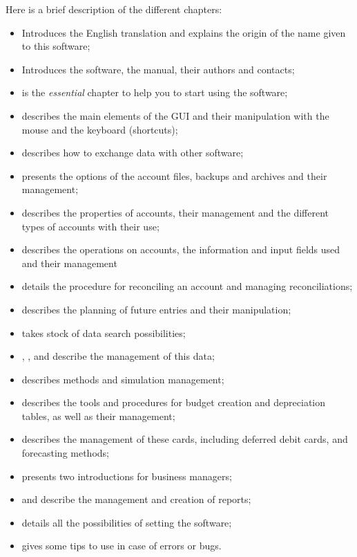 

Here is a brief description of the different chapters:

\begin{itemize}%
	\item {} Introduces the English translation and explains the origin of the name given to this software;
	\item {} Introduces the software, the manual, their authors and contacts;
	\item {} is the \emph{essential} chapter to help you to start using the software;
	\item {} describes the main elements of the GUI and their manipulation with the mouse and the keyboard (shortcuts);
	\item {} describes how to exchange data with other software;
	\item {} presents the options of the account files, backups and archives and their management;
	\item {} describes the properties of accounts, their management and the different types of accounts with their use;
	\item {} describes the operations on accounts, the information and input fields used and their management
	\item {} details the procedure for reconciling an account and managing reconciliations;
	\item {} describes the planning of future entries and their manipulation;
	\item {} takes stock of data search possibilities;
	\item {}, ,  and  describe the management of this data;
	\item {} describes methods and simulation management;
	\item {} describes the tools and procedures for budget creation and depreciation tables, as well as their management;
	\item {} describes the management of these cards, including deferred debit cards, and forecasting methods;
	\item {} presents two introductions for business managers;
	\item {} and  describe the management and creation of reports;
	\item {} details all the possibilities of setting the software;
	\item {} gives some tips to use in case of errors or bugs.
\end{itemize}

